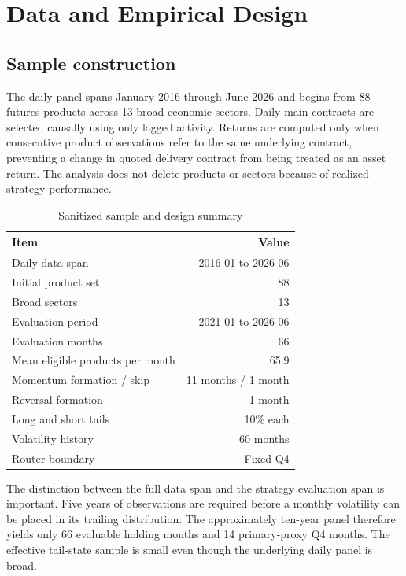 \section{Data and Empirical Design}

\subsection{Sample construction}

The daily panel spans January 2016 through June 2026 and begins from 88 futures products
across 13 broad economic sectors. Daily main contracts are selected causally using only
lagged activity. Returns are computed only when consecutive product observations refer to
the same underlying contract, preventing a change in quoted delivery contract from being
treated as an asset return. The analysis does not delete products or sectors because of
realized strategy performance.

\begin{table}[H]
\centering
\caption{Sanitized sample and design summary}
\label{tab:sample}
\begin{tabular}{lr}
\toprule
Item & Value \\
\midrule
Daily data span & 2016-01 to 2026-06 \\
Initial product set & 88 \\
Broad sectors & 13 \\
Evaluation period & 2021-01 to 2026-06 \\
Evaluation months & 66 \\
Mean eligible products per month & 65.9 \\
Momentum formation / skip & 11 months / 1 month \\
Reversal formation & 1 month \\
Long and short tails & 10\% each \\
Volatility history & 60 months \\
Router boundary & Fixed Q4 \\
\bottomrule
\end{tabular}
\end{table}

The distinction between the full data span and the strategy evaluation span is
important. Five years of observations are required before a monthly volatility can be
placed in its trailing distribution. The approximately ten-year panel therefore yields
only 66 evaluable holding months and 14 primary-proxy Q4 months. The effective tail-state
sample is small even though the underlying daily panel is broad.

